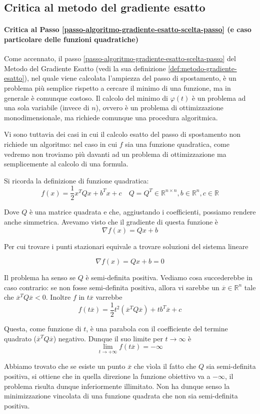 \subsection{Critica al metodo del gradiente esatto}
\label{critica-gradiente-esatto}
\paragraph{Critica al Passo
\ref{passo-algoritmo-gradiente-esatto-scelta-passo} (e caso
particolare delle funzioni quadratiche)} Come accennato, il passo
\ref{passo-algoritmo-gradiente-esatto-scelta-passo} del Metodo del
Gradiente Esatto (vedi la sua definizione
\ref{def:metodo-gradiente-esatto}), nel quale viene calcolata
l'ampiezza del passo di spostamento, \`e un problema pi\`u semplice
rispetto a cercare il minimo di una funzione, ma in generale \`e
comunque costoso. Il calcolo del minimo di $\varphi(t)$ \`e un problema
ad una sola variabile (invece di $n$), ovvero \`e un problema di
ottimizzazione monodimensionale, ma richiede comunque una procedura
algoritmica.

Vi sono tuttavia dei casi in cui il calcolo esatto del passo di
spostamento non richiede un algoritmo: nel caso in cui $f$ sia una
funzione quadratica, come vedremo non troviamo pi\`u davanti ad un
problema di ottimizzazione ma semplicemente al calcolo di una formula.

Si ricorda la definizione di funzione quadratica:
$$f(x) = \frac{1}{2} x^{T} Qx + b^{T}x + c \quad Q = Q^{T} \in \mathbb{R}^{n\times n} ,b \in \mathbb{R}^{n}, c \in \mathbb{R}$$

Dove $Q$ \`e una matrice quadrata e che, aggiustando i coefficienti,
possiamo rendere anche simmetrica. Avevamo visto che il gradiente di
questa funzione \`e
$$ \nabla f(x) = Qx +b $$

Per cui trovare i punti stazionari equivale a trovare soluzioni del
sistema lineare

$$ \nabla f(x) = Qx +b = 0$$

\begin{property} Il problema ha senso se $Q$ \`e semi-definita
positiva. Vediamo cosa succederebbe in caso contrario: se non fosse
semi-definita positiva, allora vi sarebbe un $\overline{x} \in
\mathbb{R}^n$ tale che $\overline{x}^T Q \overline{x} < 0$. Inoltre
$f$ in $t\overline{x}$ varrebbe
$$f(t \overline{x}) = \frac{1}{2} t^2 (\overline{x}^T Q \overline{x}) + t b^T \overline{x} + c$$

Questa, come funzione di $t$, \`e una parabola con il coefficiente del
termine quadrato ($\overline{x}^T Q \overline{x}$) negativo. Dunque il
suo limite per $t \to \infty$ \`e
$$\lim_{t \to +\infty} f(t \overline{x}) = - \infty$$

Abbiamo trovato che se esiste un punto $\overline{x}$ che vìola il
fatto che $Q$ sia semi-definita positiva, si ottiene che in quella
direzione la funzione obiettivo va a $-\infty$, il problema risulta
dunque inferiormente illimitato. Non ha dunque senso la minimizzazione
vincolata di una funzione quadrata che non sia semi-definita positiva.
\end{property}

